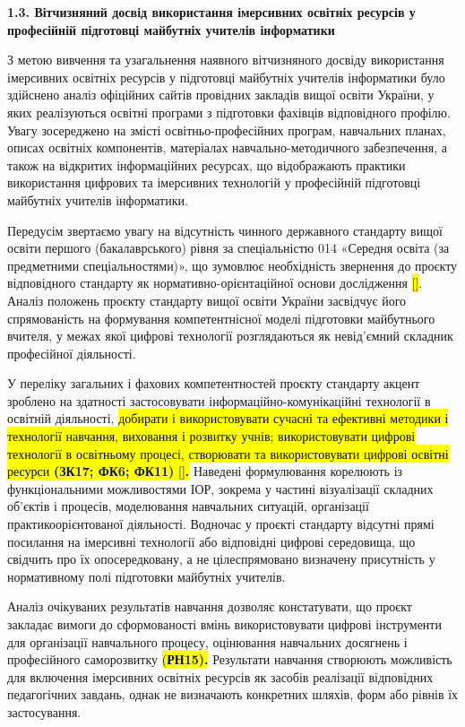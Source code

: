 \textbf{1.3. Вітчизняний досвід використання імерсивних освітніх ресурсів у професійній підготовці майбутніх учителів інформатики}

З метою вивчення та узагальнення наявного вітчизняного досвіду використання імерсивних освітніх ресурсів у підготовці майбутніх учителів інформатики було здійснено аналіз офіційних сайтів провідних закладів вищої освіти України, у яких реалізуються освітні програми з підготовки фахівців відповідного профілю. Увагу зосереджено на змісті освітньо-професійних програм, навчальних планах, описах освітніх компонентів, матеріалах навчально-методичного забезпечення, а також на відкритих інформаційних ресурсах, що відображають практики використання цифрових та імерсивних технологій у професійній підготовці майбутніх учителів інформатики.

Передусім звертаємо увагу на відсутність чинного державного стандарту вищої освіти першого (бакалаврського) рівня за спеціальністю 014 «Середня освіта (за предметними спеціальностями)», що зумовлює необхідність звернення до проєкту відповідного стандарту як нормативно-орієнтаційної основи дослідження \hl{{[}{]}}. Аналіз положень проєкту стандарту вищої освіти України засвідчує його спрямованість на формування компетентнісної моделі підготовки майбутнього вчителя, у межах якої цифрові технології розглядаються як невід'ємний складник професійної діяльності.

У переліку загальних і фахових компетентностей проєкту стандарту акцент зроблено на здатності застосовувати інформаційно-комунікаційні технології в освітній діяльності, \hl{добирати і використовувати сучасні та ефективні методики і технології навчання, виховання і розвитку учнів; використовувати цифрові технології в освітньому процесі, створювати та використовувати цифрові освітні ресурси \textbf{(ЗК17; ФК6; ФК11)} {[}{]}\textbf{.}} Наведені формулювання корелюють із функціональними можливостями ІОР, зокрема у частині візуалізації складних об'єктів і процесів, моделювання навчальних ситуацій, організації практикоорієнтованої діяльності. Водночас у проєкті стандарту відсутні прямі посилання на імерсивні технології або відповідні цифрові середовища, що свідчить про їх опосередковану, а не цілеспрямовано визначену присутність у нормативному полі підготовки майбутніх учителів.

Аналіз очікуваних результатів навчання дозволяє констатувати, що проєкт закладає вимоги до сформованості вмінь використовувати цифрові інструменти для організації навчального процесу, оцінювання навчальних досягнень і професійного саморозвитку \hl{(\textbf{РН15).}} Результати навчання створюють можливість для включення імерсивних освітніх ресурсів як засобів реалізації відповідних педагогічних завдань, однак не визначають конкретних шляхів, форм або рівнів їх застосування.

